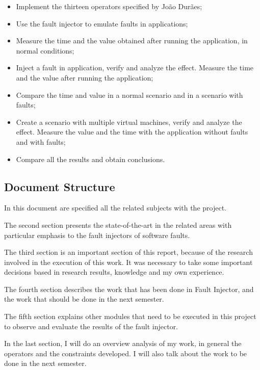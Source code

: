 \begin{itemize}
	\item Implement the thirteen operators specified by João Durães;
	\item Use the fault injector to emulate faults in applications;
	\item Measure the time and the value obtained after running the application, in normal conditions;
	\item Inject a fault in application, verify and analyze the effect. Measure the time and the value after running the application;
	\item Compare the time and value in a normal scenario and in a scenario with faults;
	\item Create a scenario with multiple virtual machines, verify and analyze the effect. Measure the value and the time with the application without faults and with faults;
	\item Compare all the results and obtain conclusions.

\end{itemize}


\subsection{Document Structure}

In this document are specified all the related subjects with the project.

The second section presents the state-of-the-art in the related areas with particular emphasis to the fault injectors of software faults.

The third section is an important section of this report, because of the research involved in the execution of this work. It was necessary to take some important decisions based in research results, knowledge and my own experience.

The fourth section describes the work that has been done in Fault Injector, and the work that should be done in the next semester.

The fifth section explains other modules that need to be executed in this project to observe and evaluate the results of the fault injector.

In the last section, I will do an overview analysis of my work, in general the operators and the constraints developed. I will also talk about the work to be done in the next semester.


